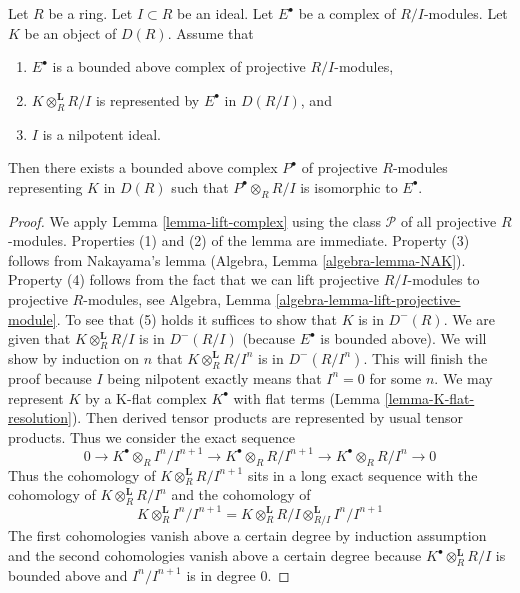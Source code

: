\begin{lemma}
\label{lemma-lift-complex-projectives}
Let $R$ be a ring. Let $I \subset R$ be an ideal. Let $E^\bullet$
be a complex of $R/I$-modules. Let $K$ be an object of $D(R)$. Assume that
\begin{enumerate}
\item $E^\bullet$ is a bounded above complex of projective $R/I$-modules,
\item $K \otimes_R^\mathbf{L} R/I$ is represented by $E^\bullet$ in
$D(R/I)$, and
\item $I$ is a nilpotent ideal.
\end{enumerate}
Then there exists a bounded above complex $P^\bullet$ of projective
$R$-modules representing $K$ in $D(R)$ such that $P^\bullet \otimes_R R/I$
is isomorphic to $E^\bullet$.
\end{lemma}

\begin{proof}
We apply Lemma \ref{lemma-lift-complex} using the class $\mathcal{P}$
of all projective $R$-modules. Properties (1) and (2) of the lemma
are immediate. Property (3) follows from Nakayama's lemma
(Algebra, Lemma \ref{algebra-lemma-NAK}).
Property (4) follows from the fact that we can lift projective
$R/I$-modules to projective $R$-modules, see
Algebra, Lemma \ref{algebra-lemma-lift-projective-module}.
To see that (5) holds it suffices to show that $K$ is in $D^{-}(R)$.
We are given that $K \otimes_R^\mathbf{L} R/I$ is in $D^{-}(R/I)$
(because $E^\bullet$ is bounded above).
We will show by induction on $n$ that
$K \otimes_R^\mathbf{L} R/I^n$ is in $D^{-}(R/I^n)$.
This will finish the proof because $I$ being nilpotent exactly
means that $I^n = 0$ for some $n$.
We may represent $K$ by a K-flat complex $K^\bullet$ with flat terms
(Lemma \ref{lemma-K-flat-resolution}).
Then derived tensor products are represented by usual tensor products.
Thus we consider the exact sequence
$$
0 \to K^\bullet \otimes_R I^n/I^{n + 1} \to
K^\bullet \otimes_R R/I^{n + 1} \to
K^\bullet \otimes_R R/I^n \to 0
$$
Thus the cohomology of $K \otimes_R^\mathbf{L} R/I^{n + 1}$
sits in a long exact sequence with the cohomology of
$K \otimes_R^\mathbf{L} R/I^n$ and the cohomology of
$$
K \otimes_R^\mathbf{L} I^n/I^{n + 1} =
K \otimes_R^\mathbf{L} R/I \otimes_{R/I}^\mathbf{L} I^n/I^{n + 1}
$$
The first cohomologies vanish above a certain degree
by induction assumption and the second cohomologies vanish
above a certain degree because $K^\bullet \otimes_R^\mathbf{L} R/I$
is bounded above and $I^n/I^{n + 1}$ is in degree $0$.
\end{proof}

